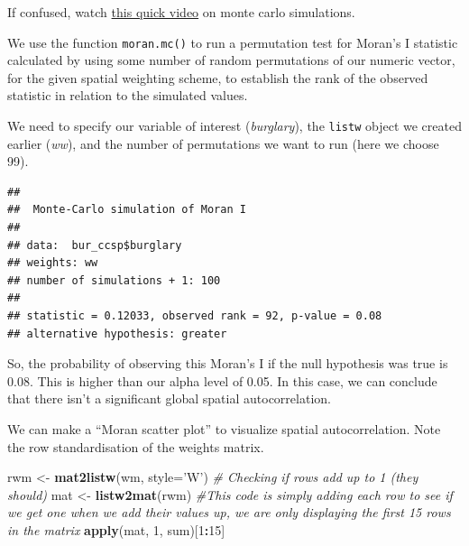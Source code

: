 \documentclass[]{book}
\newenvironment{Shaded}{\begin{snugshade}}{\end{snugshade}}
\newcommand{\CommentTok}[1]{\textcolor[rgb]{0.56,0.35,0.01}{\textit{#1}}}
\newcommand{\DataTypeTok}[1]{\textcolor[rgb]{0.13,0.29,0.53}{#1}}
\newcommand{\DecValTok}[1]{\textcolor[rgb]{0.00,0.00,0.81}{#1}}
\newcommand{\KeywordTok}[1]{\textcolor[rgb]{0.13,0.29,0.53}{\textbf{#1}}}
\newcommand{\NormalTok}[1]{#1}
\newcommand{\OperatorTok}[1]{\textcolor[rgb]{0.81,0.36,0.00}{\textbf{#1}}}
\newcommand{\StringTok}[1]{\textcolor[rgb]{0.31,0.60,0.02}{#1}}
\begin{document}
If confused, watch \href{https://www.youtube.com/watch?v=5nM5e2_1OQ0}{this quick video} on monte carlo simulations.

We use the function \texttt{moran.mc()} to run a permutation test for Moran's I statistic calculated by using some number of random permutations of our numeric vector, for the given spatial weighting scheme, to establish the rank of the observed statistic in relation to the simulated values.

We need to specify our variable of interest (\emph{burglary}), the \texttt{listw} object we created earlier (\emph{ww}), and the number of permutations we want to run (here we choose 99).

\begin{Shaded}
\end{Shaded}

\begin{verbatim}
## 
##  Monte-Carlo simulation of Moran I
## 
## data:  bur_ccsp$burglary 
## weights: ww  
## number of simulations + 1: 100 
## 
## statistic = 0.12033, observed rank = 92, p-value = 0.08
## alternative hypothesis: greater
\end{verbatim}

So, the probability of observing this Moran's I if the null hypothesis was true is 0.08. This is higher than our alpha level of 0.05. In this case, we can conclude that there isn't a significant global spatial autocorrelation.

We can make a ``Moran scatter plot'' to visualize spatial autocorrelation. Note the row standardisation of the weights matrix.

\begin{Shaded}
\begin{Highlighting}[]
\NormalTok{rwm <-}\StringTok{ }\KeywordTok{mat2listw}\NormalTok{(wm, }\DataTypeTok{style=}\StringTok{'W'}\NormalTok{)}
\CommentTok{# Checking if rows add up to 1 (they should)}
\NormalTok{mat <-}\StringTok{ }\KeywordTok{listw2mat}\NormalTok{(rwm)}
\CommentTok{#This code is simply adding each row to see if we get one when we add their values up, we are only displaying the first 15 rows in the matrix}
\KeywordTok{apply}\NormalTok{(mat, }\DecValTok{1}\NormalTok{, sum)[}\DecValTok{1}\OperatorTok{:}\DecValTok{15}\NormalTok{]}
\end{Highlighting}
\end{Shaded}
\end{document}
